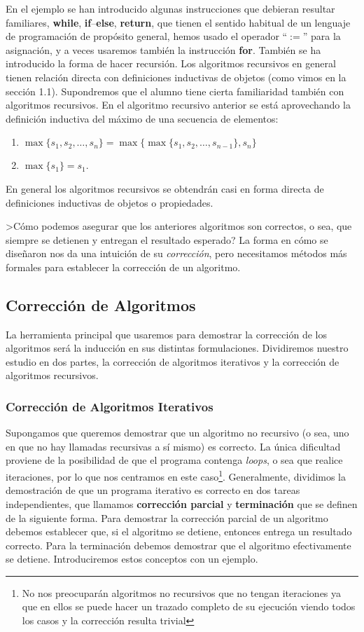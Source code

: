 En el ejemplo se han introducido algunas instrucciones que debieran resultar familiares, {\bf while}, {\bf if}--{\bf else}, {\bf return}, que tienen el sentido habitual de un lenguaje de programación de propósito general, hemos usado el operador ``$:=$'' para la asignación, y a veces usaremos también la instrucción {\bf for}.
También se ha introducido la forma de hacer recursión.
Los algoritmos recursivos en general tienen relación directa con definiciones inductivas de objetos (como vimos en la sección 1.1).
Supondremos que el alumno tiene cierta familiaridad también con algoritmos recursivos.
En el algoritmo recursivo anterior se está aprovechando la definición inductiva del máximo de una secuencia de elementos:
\begin{enumerate}
  \itemsep 0pt
  \item $\max\{s_1,s_2,\ldots,s_n\}=\max\{\max\{s_1,s_2,\ldots,s_{n-1}\},s_n\}$
  \item $\max\{s_1\}=s_1$.
\end{enumerate}
En general los algoritmos recursivos se obtendrán casi en forma directa de definiciones inductivas de objetos o propiedades.
 
>Cómo podemos asegurar que los anteriores algoritmos son correctos, o sea, que siempre se detienen y entregan el resultado esperado?
La forma en cómo se diseñaron nos da una intuición de su \emph{corrección}, pero necesitamos métodos más formales para establecer la corrección de un algoritmo.


\subsection{Corrección de Algoritmos}
La herramienta principal que usaremos para demostrar la corrección de los algoritmos será la inducción en sus distintas formulaciones.
Dividiremos nuestro estudio en dos partes, la corrección de algoritmos iterativos y la corrección de algoritmos recursivos.

\subsubsection*{Corrección de Algoritmos Iterativos}
Supongamos que queremos demostrar que un algoritmo no recursivo (o sea, uno en que no hay llamadas recursivas a sí mismo) es correcto. 
La única dificultad proviene de la posibilidad de que el programa contenga \emph{loops}, o sea que realice iteraciones, por lo que nos centramos en este caso\footnote{No nos preocuparán algoritmos no recursivos que no tengan iteraciones ya que en ellos se puede hacer un trazado completo de su ejecución viendo todos los casos y la corrección resulta trivial}.
Generalmente, dividimos la demostración de que un programa iterativo es correcto en dos tareas independientes, que llamamos {\bf corrección parcial} y {\bf terminación} que se definen de la siguiente forma.
Para demostrar la corrección parcial de un algoritmo debemos establecer que, si el algoritmo se detiene, entonces entrega un resultado correcto.
Para la terminación debemos demostrar que el algoritmo efectivamente se detiene.
Introduciremos estos conceptos con un ejemplo.

